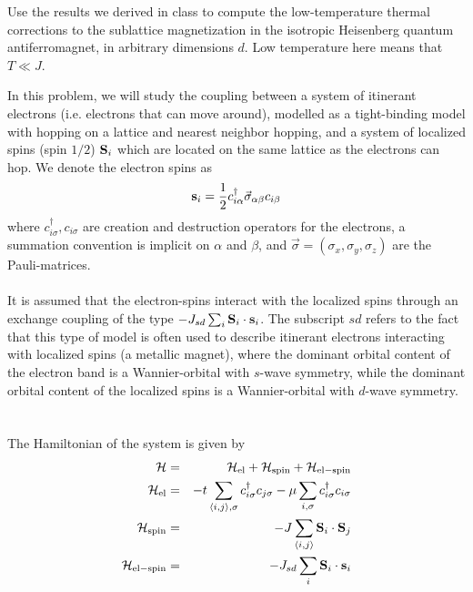 
\begin{problem}
Use the results we derived in class to compute the low-temperature thermal corrections to the sublattice magnetization in the isotropic Heisenberg quantum antiferromagnet, in arbitrary dimensions $d$. Low temperature here means that $T \ll J$.   
\end{problem}
\begin{problem}
	
In this problem, we will study the coupling between a system of itinerant electrons (i.e. electrons that can move around), modelled as a tight-binding model with hopping on a lattice and nearest neighbor hopping, and a system of localized spins (spin $1/2$) ${\bf S}_i$ which are located on the same lattice as the electrons can hop. We denote the electron spins as 
\begin{eqnarray}
	{\bf s}_i = \frac{1}{2} c^{\dagger}_{i \alpha} {\vec  \sigma}_{\alpha \beta} c_{i \beta} \nonumber
\end{eqnarray}
where $c^{\dagger}_{i \sigma}, c_{i \sigma}$ are creation and destruction operators for the electrons, a summation convention is implicit on $\alpha$ and $\beta$, and $\vec \sigma = (\sigma_x,\sigma_y,\sigma_z)$ are the Pauli-matrices. 
\ \\
\ \\
It is assumed that  the electron-spins interact with the localized spins through an exchange coupling of the type 
$-J_{sd}  \sum_i {\bf S}_i \cdot {\bf s}_i$. The subscript $sd$ refers to the fact that this type of model is often used to describe itinerant electrons interacting with localized spins (a metallic magnet), where the dominant orbital content of the electron band is a Wannier-orbital with $s$-wave symmetry, while the dominant orbital content of the localized spins is a Wannier-orbital with  $d$-wave symmetry.  
\ \\
\ \\
The Hamiltonian of the system is given by 
\begin{eqnarray}
	\Ha & = & \Ha_{\rm{el}} + \Ha_{\rm{spin}} + \Ha_{\rm{el-spin}} \nonumber \\ 
	\Ha_{\rm{el}} & = & - t \sum_{\langle i,j \rangle, \sigma } c^{\dagger}_{i \sigma}c_{j \sigma} - \mu \sum_{i,\sigma} c^{\dagger}_{i \sigma}c_{i \sigma} \nonumber \\
	\Ha_{\rm{spin}} & = & -J \sum_{\langle i,j \rangle } {\bf S}_i \cdot {\bf S}_j \nonumber \\ 
	\Ha_{\rm{el-spin}} & = & - J_{sd} \sum_i {\bf S}_i \cdot {\bf s}_i \nonumber 

\end{eqnarray}
\end{problem}
